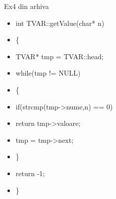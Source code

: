 \documentclass[pdf]{beamer}
\begin{document}
\begin{frame}{Ex4 din arhiva}
\begin{itemize}
\item
 int TVAR::getValue(char* n)
\item \hspace{4mm}
	 \{
\item \hspace{6mm}
	   TVAR* tmp = TVAR::head;
\item \hspace{6mm}
	   while(tmp != NULL)
\item \hspace{6mm}
	   \{
\item \hspace{8mm}
	     if(strcmp(tmp->nume,n) == 0)
\item \hspace{10mm}
	      return tmp->valoare;
\item \hspace{8mm}
	     tmp = tmp->next;
\item \hspace{6mm}
	   \}
\item \hspace{6mm}
	   return -1;
\item \hspace{4mm}
	  \}
\end{itemize}
\end{frame}
\end{document}
